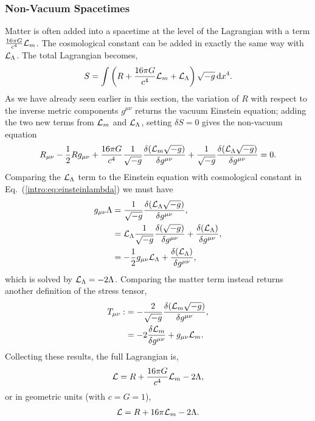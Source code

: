 \subsubsection*{Non-Vacuum Spacetimes}
Matter is often added into a spacetime at the level of the Lagrangian with a term $\frac{16 \pi G}{c^4}\mathcal{L}_m$. The cosmological constant can be added in exactly the same way with $\mathcal{L}_\Lambda$. The total Lagrangian becomes,
\begin{equation}
S = \int \left({R} + \frac{16 \pi G}{c^4} \mathcal{L}_m + \mathcal{L}_\Lambda \right)\sqrt{-g} \,\dd x^4.
\end{equation}
As we have already seen earlier in this section, the variation of $R$ with respect to the inverse metric components $g^{\mu\nu}$ returns the vacuum Einstein equation; adding the two new terms from $\mathcal{L}_m$ and $\mathcal{L}_\Lambda$, setting $\delta S =0$ gives the non-vacuum equation
\begin{equation}
R_{\mu\nu} - \frac{1}{2}Rg_{\mu\nu} + \frac{16 \pi G}{c^4}\frac{1}{\sqrt{-g}}\frac{\delta( \mathcal{L}_m \sqrt{-g})}{\delta g^{\mu\nu}} + \frac{1}{\sqrt{-g}}\frac{\delta (\mathcal{L}_\Lambda \sqrt{-g})}{\delta g^{\mu\nu}} = 0.
\end{equation}
Comparing the $\mathcal{L}_\Lambda$ term to the Einstein equation with cosmological constant in Eq.~(\ref{intro:eq:einsteinlambda}) we must have
\begin{align}
g_{\mu\nu} \Lambda &= \frac{1}{\sqrt{-g}}\frac{\delta (\mathcal{L}_\Lambda \sqrt{-g})}{\delta g^{\mu\nu}} , \\
&= \mathcal{L}_\Lambda \frac{1}{\sqrt{-g}}\frac{\delta ( \sqrt{-g})}{\delta g^{\mu\nu}} + \frac{\delta (\mathcal{L}_\Lambda )}{\delta g^{\mu\nu}}, \\
&=-\frac{1}{2}g_{\mu\nu}\mathcal{L}_\Lambda  + \frac{\delta (\mathcal{L}_\Lambda )}{\delta g^{\mu\nu}}, \\
\end{align}
which is solved by $\mathcal{L}_\Lambda = -2\Lambda$. Comparing the matter term instead returns another definition of the stress tensor,
\begin{align}
T_{\mu\nu}:&=-\frac{2}{\sqrt{-g}}\frac{\delta (\mathcal{L}_m \sqrt{-g})}{\delta g^{\mu\nu}},\\
&= -2\frac{\delta \mathcal{L}_m}{\delta g^{\mu\nu}} + g_{\mu\nu} \mathcal{L}_m .\label{intro:eq:Tdef}
\end{align}
Collecting these results, the full Lagrangian is,
\begin{align}
\mathcal{L} = R + \frac{16 \pi G}{c^4} \mathcal{L}_m -2\Lambda,
\end{align}
or in geometric units (with $c=G=1$),
\begin{align}
\mathcal{L} = R + 16 \pi \mathcal{L}_m -2\Lambda.
\end{align}
